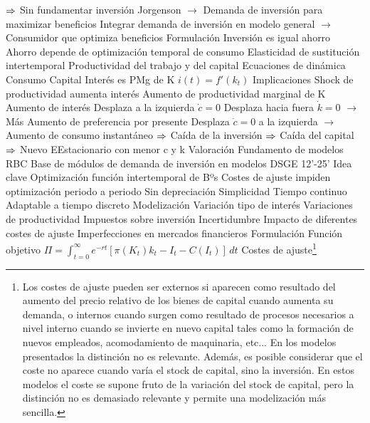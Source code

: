 \documentclass{nuevotema}
\begin{document}
\begin{esquemal}
				\4[] $\Rightarrow$ Sin fundamentar inversión
				\4[] Jorgenson
				\4[] $\to$ Demanda de inversión para maximizar beneficios
				\4[] Integrar demanda de inversión en modelo general
				\4[] $\to$ Consumidor que optimiza beneficios
			\3 Formulación
				\4 Inversión es igual ahorro
				\4 Ahorro depende de optimización temporal de consumo
				\4[] Elasticidad de sustitución intertemporal
				\4[] Productividad del trabajo y del capital
				\4 Ecuaciones de dinámica
				\4[] Consumo
				\4[] 
				\4[] 
				\4[] Capital
				\4[] 
				\4[] 
				\4 Interés es PMg de K
				\4[] $i(t) = f'(k_t)$
			\3 Implicaciones
				\4 Shock de productividad aumenta interés
				\4[] Aumento de productividad marginal de K
				\4 Aumento de interés
				\4[] Desplaza a la izquierda $\dot{c}=0$
				\4[] Desplaza hacia fuera $\dot{k}=0$
				\4[] $\to$ Más
				\4 Aumento de preferencia por presente
				\4[] Desplaza $\dot{c}=0$ a la izquierda
				\4[] $\to$ Aumento de consumo instantáneo
				\4[] $\Rightarrow$ Caída de la inversión
				\4[] $\Rightarrow$ Caída del capital
				\4[] $\Rightarrow$ Nuevo EEstacionario con menor c y k
			\3 Valoración
				\4 Fundamento de modelos RBC
				\4 Base de módulos de demanda de inversión en modelos DSGE
	\1  12'-25'
		\2 Idea clave
			\3 Optimización función intertemporal de Bºs
				\4 Costes de ajuste impiden optimización periodo a periodo
			\3 Sin depreciación
				\4 Simplicidad
			\3 Tiempo continuo
				\4 Adaptable a tiempo discreto
			\3 Modelización
				\4 Variación tipo de interés
				\4 Variaciones de productividad
				\4 Impuestos sobre inversión
				\4 Incertidumbre
				\4 Impacto de diferentes costes de ajuste
				\4 Imperfecciones en mercados financieros
		\2 Formulación
			\3 Función objetivo
				\4 $\Pi = \int_{t=0}^\infty e^{-rt} \left[ \pi \left(  K_t \right) k_t - I_t- C \left( I_t \right) \right] \, dt$
				\4 Costes de ajuste\footnote{Los costes de ajuste pueden ser externos si aparecen como resultado del aumento del precio relativo de los bienes de capital cuando aumenta su demanda, o internos cuando surgen como resultado de procesos necesarios a nivel interno cuando se invierte en nuevo capital tales como la formación de nuevos empleados, acomodamiento de maquinaria, etc... En los modelos presentados la distinción no es relevante. Además, es posible considerar que el coste no aparece cuando varía el stock de capital, sino la inversión. En estos modelos el coste se supone fruto de la variación del stock de capital, pero la distinción no es demasiado relevante y permite una modelización más sencilla.}

\end{esquemal}
\end{document}
